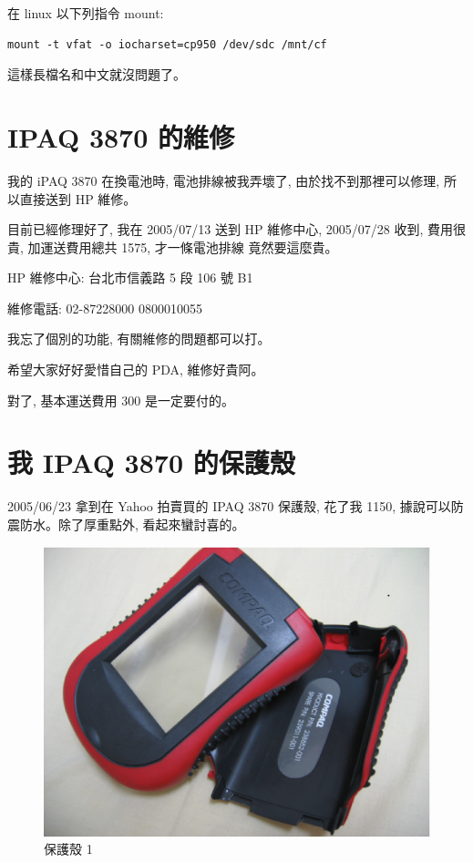 \documentclass[12pt,a4paper]{article}
\begin{document}
\begin{CJK}{UTF8}{bsmi}
在 linux 以下列指令 mount:
\begin{verbatim}
mount -t vfat -o iocharset=cp950 /dev/sdc /mnt/cf
\end{verbatim}

這樣長檔名和中文就沒問題了。

\section{IPAQ 3870 的維修}
我的 iPAQ 3870 在換電池時, 電池排線被我弄壞了, 
由於找不到那裡可以修理, 所以直接送到 HP 維修。

目前已經修理好了, 我在 2005/07/13 送到 HP 維修中心,
2005/07/28 收到, 費用很貴,
加運送費用總共 1575, 才一條電池排線
竟然要這麼貴。

HP 維修中心: 台北市信義路 5 段 106 號 B1

        維修電話: 02-87228000
                  0800010055

        我忘了個別的功能,
        有關維修的問題都可以打。

希望大家好好愛惜自己的 PDA, 維修好貴阿。

對了, 基本運送費用 300 是一定要付的。

\section{我 IPAQ 3870 的保護殼}
2005/06/23 拿到在 Yahoo 拍賣買的 IPAQ 3870 保護殼,
花了我 1150, 據說可以防震防水。除了厚重點外,
看起來蠻討喜的。

\begin{figure}[htbp]
\centering
\includegraphics[scale=0.4]{eps/shell_1.eps}
\caption{保護殼 1}
\end{figure}


\end{CJK}
\end{document}
